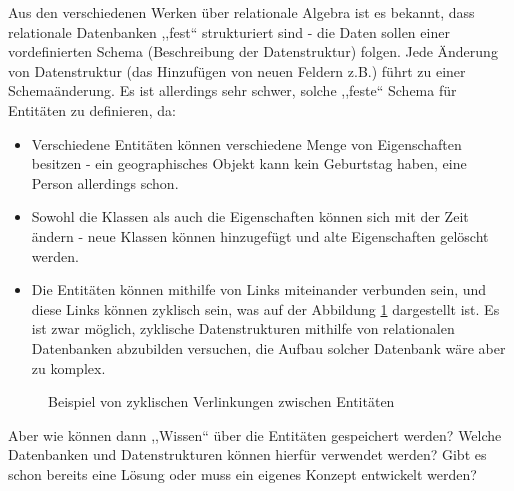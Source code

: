 Aus den verschiedenen Werken über relationale Algebra\cite{meier2013relationale} ist es bekannt, dass relationale Datenbanken ,,fest`` strukturiert sind - die Daten sollen einer vordefinierten Schema (Beschreibung der Datenstruktur) folgen. Jede Änderung von Datenstruktur (das Hinzufügen von neuen Feldern z.B.) führt zu einer Schemaänderung. Es ist allerdings sehr schwer, solche ,,feste`` Schema für Entitäten zu definieren, da:
\begin{itemize}
\item Verschiedene Entitäten können verschiedene Menge von Eigenschaften besitzen - ein geographisches Objekt kann kein Geburtstag haben, eine Person allerdings schon.
\item Sowohl die Klassen als auch die Eigenschaften können sich mit der Zeit ändern - neue Klassen können hinzugefügt und alte Eigenschaften gelöscht werden.
\item Die Entitäten können mithilfe von Links miteinander verbunden sein, und diese Links können zyklisch sein, was auf der Abbildung \ref{fig:cyclent} dargestellt ist. Es ist zwar möglich, zyklische Datenstrukturen mithilfe von relationalen Datenbanken abzubilden versuchen, die Aufbau solcher Datenbank wäre aber zu komplex.
\end{itemize}

\begin{figure}[ht]
\vbox{\small}
\caption{Beispiel von zyklischen Verlinkungen zwischen Entitäten}
\label{fig:cyclent}
\end{figure}
Aber wie können dann ,,Wissen`` über die Entitäten gespeichert werden? Welche Datenbanken und Datenstrukturen können hierfür verwendet werden? Gibt es schon bereits eine Lösung oder muss ein eigenes Konzept entwickelt werden?

